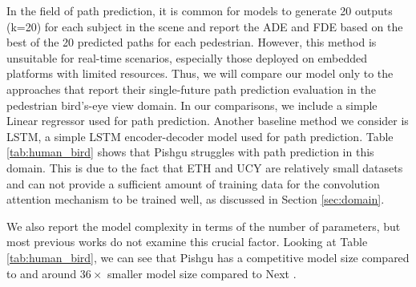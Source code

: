 \documentclass[sigconf]{acmart}
\begin{document}
In the field of path prediction, it is common for models to generate 20 outputs (k=20) for each subject in the scene and report the ADE and FDE based on the best of the 20 predicted paths for each pedestrian. However, this method is unsuitable for real-time scenarios, especially those deployed on embedded platforms with limited resources. Thus, we will compare our model only to the approaches that report their single-future path prediction evaluation in the pedestrian bird's-eye view domain. In our comparisons, we include a simple Linear regressor used for path prediction. Another baseline method we consider is LSTM, a simple LSTM encoder-decoder model used for path prediction. Table \ref{tab:human_bird} shows that Pishgu struggles with path prediction in this domain. This is due to the fact that ETH\cite{pellegrini2009you} and UCY \cite{lerner2007crowds} are relatively small datasets and can not provide a sufficient amount of training data for the convolution attention mechanism to be trained well, as discussed in Section \ref{sec:domain}. 

We also report the model complexity in terms of the number of parameters, but most previous works do not examine this crucial factor. Looking at Table \ref{tab:human_bird}, we can see that Pishgu has a competitive model size compared to \cite{mendieta2021carpe} and around $36\times $ smaller model size compared to Next \cite{liang2019peeking}.
\end{document}
